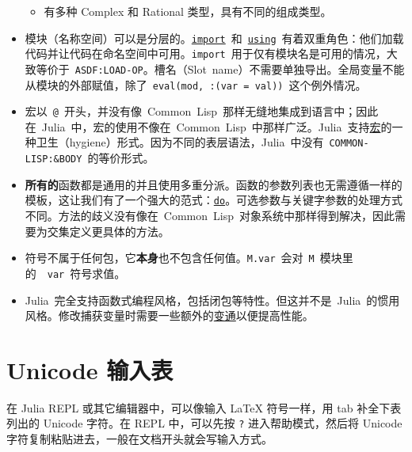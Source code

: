 \begin{itemize}
\begin{itemize}
\item 有多种 Complex 和 Rational 类型，具有不同的组成类型。

\end{itemize}

\item 模块（名称空间）可以是分层的。\hyperlink{16252475688663093021}{\texttt{import}} 和 \hyperlink{169458112978175560}{\texttt{using}} 有着双重角色：他们加载代码并让代码在命名空间中可用。\texttt{import} 用于仅有模块名是可用的情况，大致等价于 \texttt{ASDF:LOAD-OP}。槽名（Slot name）不需要单独导出。全局变量不能从模块的外部赋值，除了 \texttt{eval(mod, :(var = val))} 这个例外情况。


\item 宏以 \texttt{@} 开头，并没有像 Common Lisp 那样无缝地集成到语言中；因此在 Julia 中，宏的使用不像在 Common Lisp 中那样广泛。Julia 支持\hyperlink{15430858583934124136}{宏}的一种卫生（hygiene）形式。因为不同的表层语法，Julia 中没有 \texttt{COMMON-LISP:\&BODY} 的等价形式。


\item \textbf{所有的}函数都是通用的并且使用多重分派。函数的参数列表也无需遵循一样的模板，这让我们有了一个强大的范式：\hyperlink{16455129305818705265}{\texttt{do}}。可选参数与关键字参数的处理方式不同。方法的歧义没有像在 Common Lisp 对象系统中那样得到解决，因此需要为交集定义更具体的方法。


\item 符号不属于任何包，它\textbf{本身}也不包含任何值。\texttt{M.var} 会对 \texttt{M} 模块里的  \texttt{var} 符号求值。


\item Julia 完全支持函数式编程风格，包括闭包等特性。但这并不是 Julia 的惯用风格。修改捕获变量时需要一些额外的\hyperlink{627547588659365489}{变通}以便提高性能。

\end{itemize}


\hypertarget{13492984054190257059}{}


\chapter{Unicode 输入表}



在 Julia REPL 或其它编辑器中，可以像输入 LaTeX 符号一样，用 tab 补全下表列出的 Unicode 字符。在 REPL 中，可以先按 \texttt{?} 进入帮助模式，然后将 Unicode 字符复制粘贴进去，一般在文档开头就会写输入方式。



